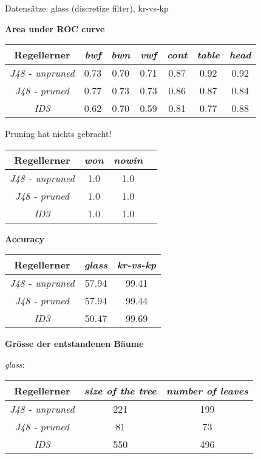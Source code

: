 
Datens\"atze: glass (discretize filter), kr-vs-kp

\textbf{Area under ROC curve}

\begin{tabular}{c|c|c|c|c|c|c}
				Regellerner       & \emph{bwf} & \emph{bwn} & \emph{vwf}  & \emph{cont} & \emph{table} & \emph{head} \\ \hline
				\emph{J48 - unpruned}& 0.73 & 0.70 & 0.71 & 0.87 & 0.92 & 0.92 \\ \hline
				\emph{J48 - pruned}  & 0.77 & 0.73 & 0.73 & 0.86 & 0.87 & 0.84 \\ \hline
				\emph{ID3}           & 0.62 & 0.70 & 0.59 & 0.81 & 0.77 & 0.88 \\ \hline
\end{tabular}

Pruning hat nichts gebracht!

\begin{tabular}{c|c|c|c}
				Regellerner       & \emph{won} & \emph{nowin} \\ \hline
				\emph{J48 - unpruned} & 1.0 & 1.0  \\ \hline
				\emph{J48 - pruned}  & 1.0 & 1.0  \\ \hline
				\emph{ID3}  & 1.0 & 1.0 \\ \hline
\end{tabular}


\textbf{Accuracy}

\begin{tabular}{c|c|c}
				Regellerner       & \emph{glass} & \emph{kr-vs-kp}  \\ \hline
				\emph{J48 - unpruned}  & 57.94 & 99.41 \\ \hline
				\emph{J48 - pruned} & 57.94  & 99.44 \\ \hline
				\emph{ID3}  & 50.47 & 99.69\\ \hline
\end{tabular}

\textbf{Gr\"osse der entstandenen B\"aume}

\emph{glass}:
\begin{tabular}{c|c|c}
	Regellerner       & \emph{size of the tree} & \emph{number of leaves}  \\ \hline
	\emph{J48 - unpruned} & 221  & 199  \\ \hline
	\emph{J48 - pruned}   & 81   & 73   \\ \hline
	\emph{ID3}            & 550  & 496  \\ \hline
\end{tabular}


